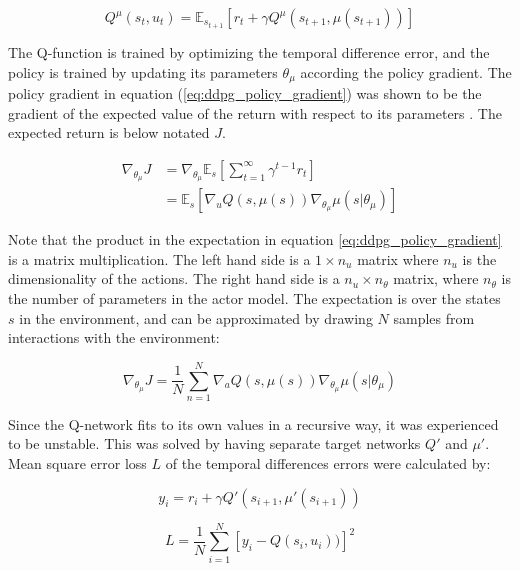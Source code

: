 \begin{equation}
    Q^\mu(s_t, u_t) = \mathbb{E}_{s_{t+1}}\left[ r_t + \gamma Q^\mu(s_{t+1}, \mu (s_{t+1})) \right]
\end{equation}

The Q-function is trained by optimizing the temporal difference error, and the
policy is trained by updating its parameters $\theta_\mu$ according the policy
gradient. The policy gradient in equation (\ref{eq:ddpg_policy_gradient}) was
shown to be the gradient of the expected value of the return with respect to
its parameters \cite{lever2014deterministic}. The expected return is below
notated $J$.

\begin{align}
    \nabla_{\theta_\mu}J &= \nabla_{\theta_\mu} \mathbb{E}_s \left[\sum_{t=1}^\infty \gamma^{t - 1} r_t \right] \\
                         &= \mathbb{E}_s \left[\nabla_u Q(s, \mu(s)) \nabla_{\theta_\mu} \mu(s|\theta_\mu) \right] \label{eq:ddpg_policy_gradient}
\end{align}

Note that the product in the expectation in equation
\ref{eq:ddpg_policy_gradient} is a matrix multiplication. The left hand side is
a $1 \times n_u$ matrix where $n_u$ is the dimensionality of the actions. The
right hand side is a $n_u \times n_\theta$ matrix, where $n_\theta$ is the
number of parameters in the actor model. The expectation is over the states $s$
in the environment, and can be approximated by drawing $N$ samples from
interactions with the environment:

\begin{equation}\label{eq:policy_gradient}
    \nabla_{\theta_\mu}J = \frac{1}{N} \sum_{n=1}^N \nabla_a Q(s, \mu(s)) \nabla_{\theta_\mu} \mu(s|\theta_\mu)
\end{equation}

Since the Q-network fits to its own values in a recursive way, it was
experienced to be unstable. This was solved by having separate target networks
$Q'$ and $\mu'$. Mean square error loss $\mathit{L}$ of the temporal
differences errors were calculated by:

\begin{equation}
    y_i = r_i + \gamma Q'(s_{i+1}, \mu'(s_{i+1}))
\end{equation}

\begin{equation}
    \mathit{L} = \frac{1}{N} \sum_{i=1}^N \left[y_i - Q(s_i, u_i)) \right]^2
\end{equation}

